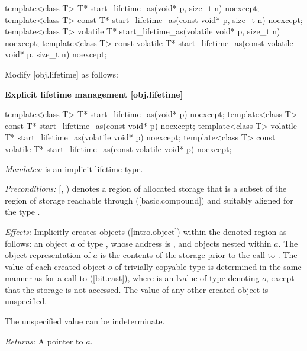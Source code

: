 \begin{addedblock}
\begin{codeblock}
template<class T>
  T* start_lifetime_as(void* p, size_t n) noexcept;
template<class T>
  const T* start_lifetime_as(const void* p, size_t n) noexcept;
template<class T>
  volatile T* start_lifetime_as(volatile void* p, size_t n) noexcept;
template<class T>
  const volatile T* start_lifetime_as(const volatile void* p, size_t n) noexcept;
\end{codeblock}
\end{addedblock}

Modify [obj.lifetime] as follows:

\textbf{Explicit lifetime management \hspace{83mm}[obj.lifetime]}

\begin{codeblock}
template<class T>
  T* start_lifetime_as(void* p) noexcept;
template<class T>
  const T* start_lifetime_as(const void* p) noexcept;
template<class T>
  volatile T* start_lifetime_as(volatile void* p) noexcept;
template<class T>
  const volatile T* start_lifetime_as(const volatile void* p) noexcept;
\end{codeblock}

\begin{adjustwidth}{0.5cm}{0.5cm}

\emph{Mandates:}  is an implicit-lifetime type.

\emph{Preconditions:} [, ) denotes a region of allocated storage that is a subset of the region of storage reachable through ([basic.compound])  and suitably aligned for the type .

\emph{Effects:} Implicitly creates objects ([intro.object]) within the denoted region as follows: an object $a$ of type , whose address is , and objects nested within $a$. The object representation of $a$ is the contents of the storage prior to the call to . The value of each created object $o$ of trivially-copyable type  is determined in the same manner as for a call to  ([bit.cast]), where  is an lvalue of type  denoting $o$, except that the storage is not accessed. The value of any other created object is unspecified. \begin{note}The unspecified value can be indeterminate.\end{note}

\emph{Returns:} A pointer to $a$.
\end{adjustwidth}

